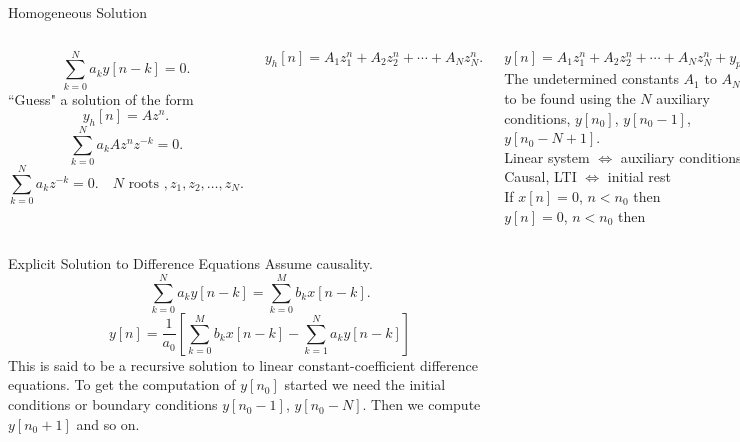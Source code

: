 \begin{frame}{Homogeneous Solution}
    \begin{columns}
    \begin{equation*}
        \sum_{k=0}^{N}a_ky[n-k] = 0.
    \end{equation*}
    ``Guess" a solution of the form
    \begin{equation*}
        y_h[n] = Az^n.
    \end{equation*}
    \begin{equation*}
        \sum_{k=0}^{N}a_k A z^n z^{-k} = 0.
    \end{equation*}
    \begin{equation*}
        \sum_{k=0}^{N}a_k  z^{-k} = 0. \quad N \text{ roots }, z_1, z_2, \dots, z_N.
    \end{equation*}

    \begin{equation*}
        y_h[n] = A_1z_1^n + A_2z_2^n + \cdots + A_Nz_N^n.
    \end{equation*}


            \begin{equation*}
                y[n] = A_1z_1^n + A_2z_2^n + \cdots + A_Nz_N^n + y_p[n]
            \end{equation*}
            The undetermined constants $A_1$ to $A_N$ are to be found using the $N$ auxiliary conditions, $y[n_0]$, $y[n_0 -1]$, $y[n_0 - N + 1]$.\\
            Linear system $\Longleftrightarrow$ auxiliary conditions 0\\
            Causal, LTI $\Longleftrightarrow$ initial rest\\
            If $x[n] = 0$, $n<n_0$ then\\
            $y[n]  = 0$, $n<n_0$ then
    \end{columns}
\end{frame}

\begin{frame}{Explicit Solution to Difference Equations}
    Assume causality.
    \begin{equation*}
        \sum_{k=0}^{N}a_ky[n-k] = \sum_{k=0}^{M}b_kx[n-k].
    \end{equation*}
    \pause
    \begin{equation*}
        y[n] = \frac{1}{a_0}\left[ \sum_{k=0}^{M}b_kx[n-k] - \sum_{k=1}^{N}a_ky[n-k] \right]
    \end{equation*}
    This is said to be a recursive solution to linear constant-coefficient difference equations. To get the computation of $y[n_0]$ started we need the initial conditions or boundary conditions  $y[n_0 -1]$, $y[n_0 - N]$.
    Then we compute $y[n_0 + 1]$ and so on.
\end{frame}


